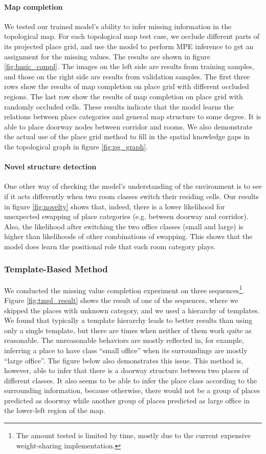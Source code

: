 \documentclass[10pt, titlepage]{article}
\theoremstyle{definition}
\begin{document}
\paragraph{Map completion} We tested our trained model's ability to infer missing information in the topological map. For each topological map test case, we occlude different parts of its projected place grid, and use the model to perform MPE inference to get an assignment for the missing values. The results are shown in figure \ref{fig:basic_compl}. The images on the left side are results from training samples, and those on the right side are results from validation samples. The first three rows show the results of map completion on place grid with different occluded regions. The last row show the results of map completion on place grid with randomly occluded cells. These results  indicate that the model learns the relations between place categories and general map structure to some degree. It is able to place doorway nodes between corridor and rooms. We also demonstrate the actual use of the place grid method to fill in the spatial knowledge gaps in the topological graph in figure \ref{fig:pg_graph}.

\paragraph{Novel structure detection} One other way of checking the model's understanding of the environment is to see if it acts differently when two room classes switch their residing cells. Our results in figure \ref{fig:novelty} shows that, indeed, there is a lower likelihood for unexpected swapping of place categories (e.g. between doorway and corridor). Also, the likelihood after switching the two office classes (small and large) is higher than likelihoods of other combinations of swapping. This shows that the model does learn the positional role that each room category plays.

\subsubsection{Template-Based Method}

We conducted the missing value completion experiment on three sequences\footnote{The amount tested is limited by time, mostly due to the current expensive weight-sharing implementation.}. Figure \ref{fig:tmpl_result} shows the result of one of the sequences, where we skipped the places with unknown category, and we used a hierarchy of templates. We found that typically a template hierarchy leads to better results than using only a single template, but there are times when neither of them work quite as reasonable. The unreasonable behaviors are mostly reflected in, for example, inferring a place to have class ``small office'' when its surroundings are mostly ``large office''. The figure below also demonstrates this issue. This method is, however, able to infer that there is a doorway structure between two places of different classes. It also seems to be able to infer the place class according to the surrounding information, because otherwise, there would not be a group of places predicted as doorway while another group of places predicted as large office in the lower-left region of the map.
\end{document}
